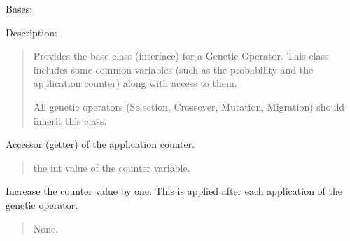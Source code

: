 \documentclass[letterpaper,10pt,english]{sphinxmanual}
\begin{document}
\begin{fulllineitems}
\label{\detokenize{pygenalgo.operators:pygenalgo.operators.genetic_operator.GeneticOperator}}
\pysigstartsignatures
{}
\pysigstopsignatures
\sphinxAtStartPar
Bases: 

\sphinxAtStartPar
Description:
\begin{quote}

\sphinxAtStartPar
Provides the base class (interface) for a Genetic Operator. This class includes some common
variables (such as the probability and the application counter) along with access to them.

\sphinxAtStartPar
All genetic operators (Selection, Crossover, Mutation, Migration) should inherit this class.
\end{quote}

\begin{fulllineitems}
\label{\detokenize{pygenalgo.operators:pygenalgo.operators.genetic_operator.GeneticOperator.counter}}
\pysigstartsignatures
{}
\pysigstopsignatures
\sphinxAtStartPar
Accessor (getter) of the application counter.
\begin{quote}\begin{description}
\sphinxAtStartPar
the int value of the counter variable.

\end{description}\end{quote}

\end{fulllineitems}


\begin{fulllineitems}
\label{\detokenize{pygenalgo.operators:pygenalgo.operators.genetic_operator.GeneticOperator.inc_counter}}
\pysigstartsignatures
{}
\pysigstopsignatures
\sphinxAtStartPar
Increase the counter value by one. This is applied
after each application of the genetic operator.
\begin{quote}\begin{description}
\sphinxAtStartPar
None.


\end{description}
\end{quote}
\end{fulllineitems}
\end{fulllineitems}
\end{document}
